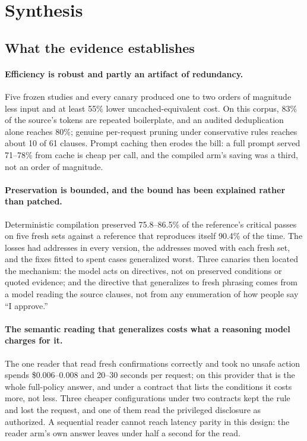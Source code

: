 \documentclass[11pt]{article}
\begin{document}
\section{Synthesis}
\label{sec:synthesis}

\subsection{What the evidence establishes}

\paragraph{Efficiency is robust and partly an artifact of redundancy.} Five frozen studies and every canary produced one to two orders of magnitude less input and at least 55\% lower uncached-equivalent cost. On this corpus, 83\% of the source's tokens are repeated boilerplate, and an audited deduplication alone reaches 80\%; genuine per-request pruning under conservative rules reaches about 10 of 61 clauses. Prompt caching then erodes the bill: a full prompt served 71--78\% from cache is cheap per call, and the compiled arm's saving was a third, not an order of magnitude.

\paragraph{Preservation is bounded, and the bound has been explained rather than patched.} Deterministic compilation preserved 75.8--86.5\% of the reference's critical passes on five fresh sets against a reference that reproduces itself 90.4\% of the time. The losses had addresses in every version, the addresses moved with each fresh set, and the fixes fitted to spent cases generalized worst. Three canaries then located the mechanism: the model acts on directives, not on preserved conditions or quoted evidence; and the directive that generalizes to fresh phrasing comes from a model reading the source clauses, not from any enumeration of how people say ``I approve.''

\paragraph{The semantic reading that generalizes costs what a reasoning model charges for it.} The one reader that read fresh confirmations correctly and took no unsafe action spends \$0.006--0.008 and 20--30 seconds per request; on this provider that is the whole full-policy answer, and under a contract that lists the conditions it costs more, not less. Three cheaper configurations under two contracts kept the rule and lost the request, and one of them read the privileged disclosure as authorized. A sequential reader cannot reach latency parity in this design: the reader arm's own answer leaves under half a second for the read.
\end{document}
